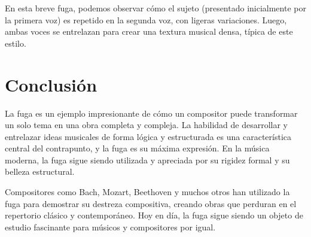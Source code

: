 
En esta breve fuga, podemos observar cómo el sujeto (presentado inicialmente por la primera voz) es repetido en la segunda voz, con ligeras variaciones. Luego, ambas voces se entrelazan para crear una textura musical densa, típica de este estilo.

\section{Conclusión}

La fuga es un ejemplo impresionante de cómo un compositor puede transformar un solo tema en una obra completa y compleja. La habilidad de desarrollar y entrelazar ideas musicales de forma lógica y estructurada es una característica central del contrapunto, y la fuga es su máxima expresión. En la música moderna, la fuga sigue siendo utilizada y apreciada por su rigidez formal y su belleza estructural.

Compositores como Bach, Mozart, Beethoven y muchos otros han utilizado la fuga para demostrar su destreza compositiva, creando obras que perduran en el repertorio clásico y contemporáneo. Hoy en día, la fuga sigue siendo un objeto de estudio fascinante para músicos y compositores por igual.

